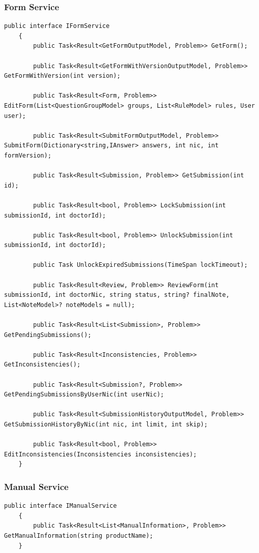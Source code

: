 \subsubsection{Form Service}

\begin{lstlisting}[style=sharpc]
	public interface IFormService
	{
		public Task<Result<GetFormOutputModel, Problem>> GetForm();
		
		public Task<Result<GetFormWithVersionOutputModel, Problem>> GetFormWithVersion(int version);
		
		public Task<Result<Form, Problem>> EditForm(List<QuestionGroupModel> groups, List<RuleModel> rules, User user);
		
		public Task<Result<SubmitFormOutputModel, Problem>> SubmitForm(Dictionary<string,IAnswer> answers, int nic, int formVersion);
		
		public Task<Result<Submission, Problem>> GetSubmission(int id);
		
		public Task<Result<bool, Problem>> LockSubmission(int submissionId, int doctorId);
		
		public Task<Result<bool, Problem>> UnlockSubmission(int submissionId, int doctorId);
		
		public Task UnlockExpiredSubmissions(TimeSpan lockTimeout);
		
		public Task<Result<Review, Problem>> ReviewForm(int submissionId, int doctorNic, string status, string? finalNote, List<NoteModel>? noteModels = null);
		
		public Task<Result<List<Submission>, Problem>> GetPendingSubmissions();
		
		public Task<Result<Inconsistencies, Problem>> GetInconsistencies();
		
		public Task<Result<Submission?, Problem>> GetPendingSubmissionsByUserNic(int userNic);
		
		public Task<Result<SubmissionHistoryOutputModel, Problem>> GetSubmissionHistoryByNic(int nic, int limit, int skip);
		
		public Task<Result<bool, Problem>> EditInconsistencies(Inconsistencies inconsistencies);
	}
\end{lstlisting}


\subsubsection{Manual Service}

\begin{lstlisting}[style=sharpc]
	public interface IManualService
	{
		public Task<Result<List<ManualInformation>, Problem>> GetManualInformation(string productName);
	}
\end{lstlisting}


